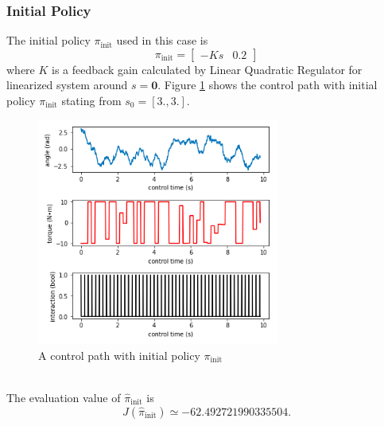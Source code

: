 \documentclass[english, dvipdfmx]{ampmt}             %
\begin{document}
\subsubsection{Initial Policy}
The initial policy $\pi_{\textrm{init}}$ used in this case is
\begin{equation}
	\pi_{\textrm{init}} = \begin{bmatrix}-Ks&0.2\end{bmatrix}
\end{equation}
where $K$ is a feedback gain calculated by Linear Quadratic Regulator for linearized system around $s = \bm{0}$. Figure \ref{sample_02} shows the control path with initial policy $\pi_{\textrm{init}}$ stating from $s_0 = [3., 3.]$.
\begin{figure}[h]
	\centering
 	\includegraphics[width=8cm]{sample_02.png}
 	\caption{A control path with initial policy $\pi_{\textrm{init}}$} \label{sample_02}
\end{figure}\\
The evaluation value of $\hat{\pi}_{\textrm{init}}$ is
\begin{equation}
	J(\hat{\pi}_{\textrm{init}}) \simeq -62.492721990335504.
\end{equation}
\end{document}
